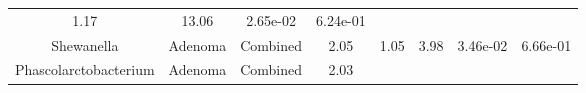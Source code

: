 \documentclass[12pt,]{article}
\begin{document}
\begin{longtable}[]{@{}cccccccc@{}}
\begin{minipage}[t]{0.13\columnwidth}
1.17\strut
\end{minipage} & \begin{minipage}[t]{0.13\columnwidth}\centering\strut
13.06\strut
\end{minipage} & \begin{minipage}[t]{0.07\columnwidth}\centering\strut
2.65e-02\strut
\end{minipage} & \begin{minipage}[t]{0.07\columnwidth}\centering\strut
6.24e-01\strut
\end{minipage}\tabularnewline
\begin{minipage}[t]{0.16\columnwidth}\centering\strut
Shewanella\strut
\end{minipage} & \begin{minipage}[t]{0.08\columnwidth}\centering\strut
Adenoma\strut
\end{minipage} & \begin{minipage}[t]{0.09\columnwidth}\centering\strut
Combined\strut
\end{minipage} & \begin{minipage}[t]{0.05\columnwidth}\centering\strut
2.05\strut
\end{minipage} & \begin{minipage}[t]{0.13\columnwidth}\centering\strut
1.05\strut
\end{minipage} & \begin{minipage}[t]{0.13\columnwidth}\centering\strut
3.98\strut
\end{minipage} & \begin{minipage}[t]{0.07\columnwidth}\centering\strut
3.46e-02\strut
\end{minipage} & \begin{minipage}[t]{0.07\columnwidth}\centering\strut
6.66e-01\strut
\end{minipage}\tabularnewline
\begin{minipage}[t]{0.16\columnwidth}\centering\strut
Phascolarctobacterium\strut
\end{minipage} & \begin{minipage}[t]{0.08\columnwidth}\centering\strut
Adenoma\strut
\end{minipage} & \begin{minipage}[t]{0.09\columnwidth}\centering\strut
Combined\strut
\end{minipage} & \begin{minipage}[t]{0.05\columnwidth}\centering\strut
2.03\strut
\end{minipage} & \begin{minipage}[t]{0.13\columnwidth}\centering\strut

\end{minipage}
\end{longtable}
\end{document}
